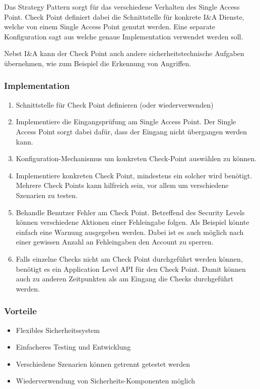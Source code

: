 Das Strategy Pattern sorgt für das verschiedene Verhalten des Single Access Point. Check Point definiert dabei die Schnittstelle für konkrete I\&A Dienste, welche von einem Single Access Point genutzt werden. Eine separate Konfiguration sagt aus welche genaue Implementation verwendet werden soll.

Nebst I\&A kann der Check Point auch andere sicherheitstechnische Aufgaben übernehmen, wie zum Beispiel die Erkennung von Angriffen.


\subsubsection*{Implementation}

\begin{enumerate}
	\item Schnittstelle für Check Point definieren (oder wiederverwenden)
	\item Implementiere die Eingangsprüfung am Single Access Point. Der Single Access Point sorgt dabei dafür, dass der Eingang nicht übergangen werden kann.
	\item Konfiguration-Mechanismus um konkreten Check-Point auswählen zu können.
	\item Implementiere konkreten Check Point, mindestens ein solcher wird benötigt. Mehrere Check Points kann hilfreich sein, vor allem um verschiedene Szenarien zu testen.
	\item Behandle Benutzer Fehler am Check Point. Betreffend des Security Levels können verschiedene Aktionen einer Fehleingabe folgen. Als Beispiel könnte einfach eine Warnung ausgegeben werden. Dabei ist es auch möglich nach einer gewissen Anzahl an Fehleingaben den Account zu sperren.
	\item Falls einzelne Checks nicht am Check Point durchgeführt werden können, benötigt es ein Application Level API für den Check Point. Damit können auch zu anderen Zeitpunkten als am Eingang die Checks durchgeführt werden.
\end{enumerate}

\subsubsection*{Vorteile}

\begin{itemize}
	\item Flexibles Sicherheitssystem
	\item Einfacheres Testing und Entwicklung
	\item Verschiedene Szenarien können getrennt getestet werden
	\item Wiederverwendung von Sicherheits-Komponenten möglich
\end{itemize}


